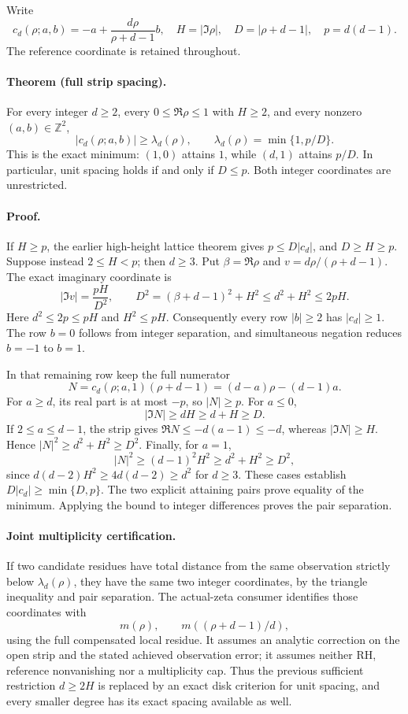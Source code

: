 Write
\[
 c_d(\rho;a,b)=-a+\frac{d\rho}{\rho+d-1}b,\quad
 H=|\Im\rho|,\quad D=|\rho+d-1|,\quad p=d(d-1).
\]
The reference coordinate is retained throughout.

\paragraph{Theorem (full strip spacing).}
For every integer \(d\ge2\), every \(0\le\Re\rho\le1\) with
\(H\ge2\), and every nonzero \((a,b)\in\mathbb Z^2\),
\[
 |c_d(\rho;a,b)|\ge \lambda_d(\rho),\qquad
 \lambda_d(\rho)=\min\{1,p/D\}.
\]
This is the exact minimum: \((1,0)\) attains \(1\), while
\((d,1)\) attains \(p/D\). In particular, unit spacing holds
if and only if \(D\le p\). Both integer coordinates are unrestricted.

\paragraph{Proof.}
If \(H\ge p\), the earlier high-height lattice theorem gives
\(p\le D|c_d|\), and \(D\ge H\ge p\).
Suppose instead \(2\le H<p\); then \(d\ge3\).
Put \(\beta=\Re\rho\) and \(v=d\rho/(\rho+d-1)\).
The exact imaginary coordinate is
\[
 |\Im v|=\frac{pH}{D^2},\qquad
 D^2=(\beta+d-1)^2+H^2\le d^2+H^2\le2pH.
\]
Here \(d^2\le2p\le pH\) and \(H^2\le pH\).
Consequently every row \(|b|\ge2\) has \(|c_d|\ge1\).
The row \(b=0\) follows from integer separation, and simultaneous
negation reduces \(b=-1\) to \(b=1\).

In that remaining row keep the full numerator
\[
 N=c_d(\rho;a,1)(\rho+d-1)
   =(d-a)\rho-(d-1)a.
\]
For \(a\ge d\), its real part is at most \(-p\), so
\(|N|\ge p\). For \(a\le0\),
\[
 |\Im N|\ge dH\ge d+H\ge D.
\]
If \(2\le a\le d-1\), the strip gives
\(\Re N\le-d(a-1)\le-d\), whereas
\(|\Im N|\ge H\). Hence \(|N|^2\ge d^2+H^2\ge D^2\).
Finally, for \(a=1\),
\[
 |N|^2\ge(d-1)^2H^2\ge d^2+H^2\ge D^2,
\]
since \(d(d-2)H^2\ge4d(d-2)\ge d^2\) for \(d\ge3\).
These cases establish \(D|c_d|\ge\min\{D,p\}\).
The two explicit attaining pairs prove equality of the minimum.
Applying the bound to integer differences proves the pair separation.

\paragraph{Joint multiplicity certification.}
If two candidate residues have total distance from the same observation
strictly below \(\lambda_d(\rho)\), they have the same two integer
coordinates, by the triangle inequality and pair separation.
The actual-zeta consumer identifies those coordinates with
\[
 m(\rho),\qquad m((\rho+d-1)/d),
\]
using the full compensated local residue. It assumes an analytic
correction on the open strip and the stated achieved observation error;
it assumes neither RH, reference nonvanishing nor a multiplicity cap.
Thus the previous sufficient restriction \(d\ge2H\) is replaced by
an exact disk criterion for unit spacing, and every smaller degree
has its exact spacing available as well.


